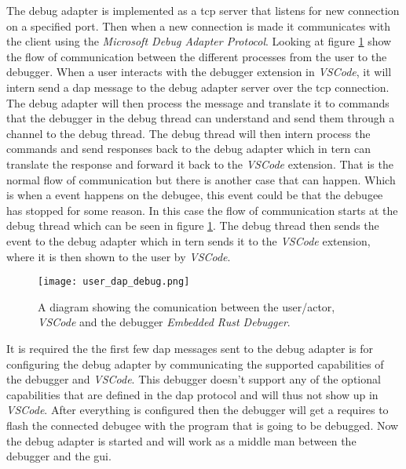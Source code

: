 
The debug adapter is implemented as a \gls{tcp} server that listens for new connection on a specified port.
Then when a new connection is made it communicates with the client using the \emph{Microsoft Debug Adapter Protocol}.
Looking at figure \ref{fig:userDAP} show the flow of communication between the different processes from the user to the debugger.
When a user interacts with the debugger extension in \emph{VSCode}, it will intern send a \acrshort{dap} message to the debug adapter server over the \gls{tcp} connection.
The debug adapter will then process the message and translate it to commands that the debugger in the debug thread can understand and send them through a channel to the debug thread.
The debug thread will then intern process the commands and send responses back to the debug adapter which in tern can translate the response and forward it back to the \emph{VSCode} extension.
That is the normal flow of communication but there is another case that can happen.
Which is when a event happens on the debugee, this event could be that the debugee has stopped for some reason.
In this case the flow of communication starts at the debug thread which can be seen in figure \ref{fig:userDAP}.
The debug thread then sends the event to the debug adapter which in tern sends it to the \emph{VSCode} extension, where it is then shown to the user by \emph{VSCode}.


\begin{figure}[h]
	\centering
	\texttt{[image: user\_dap\_debug.png]}
	\caption{A diagram showing the comunication between the user/actor, \emph{VSCode} and the debugger \emph{Embedded Rust Debugger}.}
	\label{fig:userDAP}
\end{figure}


It is required the the first few \acrshort{dap} messages sent to the debug adapter is for configuring the debug adapter by communicating the supported capabilities of the debugger and \emph{VSCode}.
This debugger doesn't support any of the optional capabilities that are defined in the \acrshort{dap} protocol and will thus not show up in \emph{VSCode}.
After everything is configured then the debugger will get a requires to flash the connected debugee with the program that is going to be debugged.
Now the debug adapter is started and will work as a middle man between the debugger and the \acrshort{gui}.


